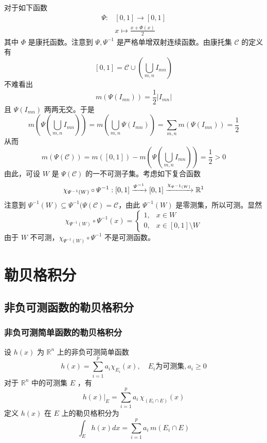 \documentclass{ctexbook}
\newcommand{\no}{\noindent}
\newcommand{\EXP}{\no {\bf 例}\quad}
\newcommand{\R}{\mathbb{R}}
\begin{document}
\EXP 对于如下函数
\[
\begin{aligned}
	\varPsi:&[0,1] \to [0,1]\\
	&x \mapsto \frac{x+\varPhi(x)}{2}
\end{aligned}
\]
其中 $\varPhi$ 是康托函数。注意到 $\varPsi,\varPsi^{-1}$ 是严格单增双射连续函数。由康托集 $\mathcal{C}$ 的定义有
\[
[0,1] = \mathcal{C} \cup \left(\bigcup_{m,n}I_{mn}\right)
\]
不难看出
\[
m(\varPsi(I_{mn})) = \frac12\lvert I_{mn} \rvert
\]
且 $\varPsi(I_{mn})$ 两两无交。于是
\[
m\left(\varPsi\left(\bigcup_{m,n} I_{mn}\right)\right) =m\left(\bigcup_{m,n} \varPsi (I_{mn})\right) =\sum_{m,n} m( \varPsi (I_{mn}) ) =  \frac12
\]
从而
\[
m(\varPsi(\mathcal{C})) = m([0,1]) - m\left(\varPsi\left(\bigcup_{m,n} I_{mn}\right)\right) = \frac12 > 0
\]
由此，可设 $W$ 是 $\varPsi(\mathcal{C})$ 的一不可测子集。考虑如下复合函数
\[
\chi_{\varPsi^{-1}(W)} \circ \varPsi^{-1}: [0,1] \xrightarrow{\varPsi^{-1}} [0,1] \xrightarrow{\chi_{\varPsi^{-1}(W)}} \R^1\\
\]
注意到 $\varPsi^{-1}(W)\subseteq\varPsi^{-1}(\varPsi(\mathcal{C})=\mathcal{C}$，由此 $\varPsi^{-1}(W)$ 是零测集，所以可测。显然
\[
\chi_{\varPsi^{-1}(W)} \circ \varPsi^{-1} (x) = \begin{cases}
	1, & x\in W\\
	0, & x\in [0,1]\setminus W
\end{cases}
\]
由于 $W$ 不可测，$\chi_{\varPsi^{-1}(W)} \circ \varPsi^{-1}$ 不是可测函数。


\chapter{勒贝格积分}

\section{非负可测函数的勒贝格积分}

\subsection{非负可测简单函数的勒贝格积分}

设 $h(x)$ 为 $\R^n$ 上的非负可测简单函数
\[
h(x) = \sum_{i=1} ^p a_i \chi_{E_i} (x),\quad  E_i \mbox{为可测集}, a_i \ge 0
\]
对于 $\R^n$ 中的可测集 $E$ ，有
\[
h(x)|_E = \sum_{i=1} ^p a_i\, \chi_{(E_i\cap E)} (x)
\]
定义 $h(x)$ 在 $E$ 上的勒贝格积分为
\[
\int_{E}h(x)dx = \sum_{i=1} ^p a_i\, m(E_i\cap E)
\]
\end{document}
